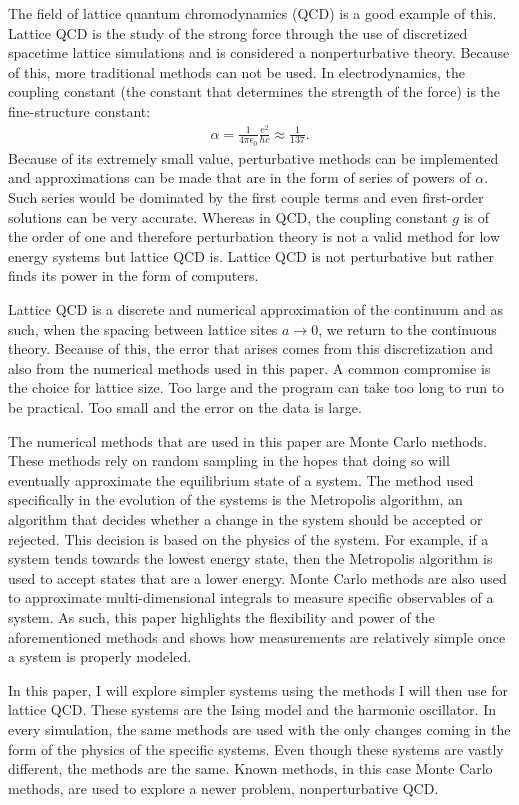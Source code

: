 \documentclass[11pt]{article}
\begin{document}
The field of lattice quantum chromodynamics (QCD) is a good example of this. Lattice QCD is the study of the strong force through the use of discretized spacetime lattice simulations and is considered a nonperturbative theory. Because of this, more traditional methods can not be used. In electrodynamics, the coupling constant (the constant that determines the strength of the force) is the fine-structure constant:
\begin{align}
	\alpha=\frac{1}{4\pi\epsilon_0}\frac{e^2}{\hbar c}\approx\frac{1}{137}.
\end{align}
Because of its extremely small value, perturbative methods can be implemented and approximations can be made that are in the form of series of powers of $\alpha$. Such series would be dominated by the first couple terms and even first-order solutions can be very accurate. Whereas in QCD, the coupling constant $g$ is of the order of one and therefore perturbation theory is not a valid method for low energy systems but lattice QCD is. Lattice QCD is not perturbative but rather finds its power in the form of computers.

Lattice QCD is a discrete and numerical approximation of the continuum and as such, when the spacing between lattice sites $a\to0$, we return to the continuous theory. Because of this, the error that arises comes from this discretization and also from the numerical methods used in this paper. A common compromise is the choice for lattice size. Too large and the program can take too long to run to be practical. Too small and the error on the data is large. 

The numerical methods that are used in this paper are Monte Carlo methods. These methods rely on random sampling in the hopes that doing so will eventually approximate the equilibrium state of a system. The method used specifically in the evolution of the systems is the Metropolis algorithm, an algorithm that decides whether a change in the system should be accepted or rejected. This decision is based on the physics of the system. For example, if a system tends towards the lowest energy state, then the Metropolis algorithm is used to accept states that are a lower energy. Monte Carlo methods are also used to approximate multi-dimensional integrals to measure specific observables of a system. As such, this paper highlights the flexibility and power of the aforementioned methods and shows how measurements are relatively simple once a system is properly modeled.

In this paper, I will explore simpler systems using the methods I will then use for lattice QCD. These systems are the Ising model and the harmonic oscillator. In every simulation, the same methods are used with the only changes coming in the form of the physics of the specific systems. Even though these systems are vastly different, the methods are the same. Known methods, in this case Monte Carlo methods,  are used to explore a newer problem, nonperturbative QCD.
\end{document}
